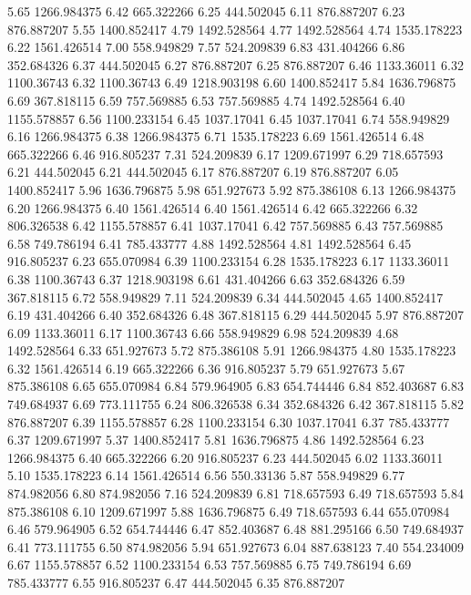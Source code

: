 5.65 	1266.984375
6.42 	665.322266
6.25 	444.502045
6.11 	876.887207
6.23 	876.887207
5.55 	1400.852417
4.79 	1492.528564
4.77 	1492.528564
4.74 	1535.178223
6.22 	1561.426514
7.00 	558.949829
7.57 	524.209839
6.83 	431.404266
6.86 	352.684326
6.37 	444.502045
6.27 	876.887207
6.25 	876.887207
6.46 	1133.36011
6.32 	1100.36743
6.32 	1100.36743
6.49 	1218.903198
6.60 	1400.852417
5.84 	1636.796875
6.69 	367.818115
6.59 	757.569885
6.53 	757.569885
4.74 	1492.528564
6.40 	1155.578857
6.56 	1100.233154
6.45 	1037.17041
6.45 	1037.17041
6.74 	558.949829
6.16 	1266.984375
6.38 	1266.984375
6.71 	1535.178223
6.69 	1561.426514
6.48 	665.322266
6.46 	916.805237
7.31 	524.209839
6.17 	1209.671997
6.29 	718.657593
6.21 	444.502045
6.21 	444.502045
6.17 	876.887207
6.19 	876.887207
6.05 	1400.852417
5.96 	1636.796875
5.98 	651.927673
5.92 	875.386108
6.13 	1266.984375
6.20 	1266.984375
6.40 	1561.426514
6.40 	1561.426514
6.42 	665.322266
6.32 	806.326538
6.42 	1155.578857
6.41 	1037.17041
6.42 	757.569885
6.43 	757.569885
6.58 	749.786194
6.41 	785.433777
4.88 	1492.528564
4.81 	1492.528564
6.45 	916.805237
6.23 	655.070984
6.39 	1100.233154
6.28 	1535.178223
6.17 	1133.36011
6.38 	1100.36743
6.37 	1218.903198
6.61 	431.404266
6.63 	352.684326
6.59 	367.818115
6.72 	558.949829
7.11 	524.209839
6.34 	444.502045
4.65 	1400.852417
6.19 	431.404266
6.40 	352.684326
6.48 	367.818115
6.29 	444.502045
5.97 	876.887207
6.09 	1133.36011
6.17 	1100.36743
6.66 	558.949829
6.98 	524.209839
4.68 	1492.528564
6.33 	651.927673
5.72 	875.386108
5.91 	1266.984375
4.80 	1535.178223
6.32 	1561.426514
6.19 	665.322266
6.36 	916.805237
5.79 	651.927673
5.67 	875.386108
6.65 	655.070984
6.84 	579.964905
6.83 	654.744446
6.84 	852.403687
6.83 	749.684937
6.69 	773.111755
6.24 	806.326538
6.34 	352.684326
6.42 	367.818115
5.82 	876.887207
6.39 	1155.578857
6.28 	1100.233154
6.30 	1037.17041
6.37 	785.433777
6.37 	1209.671997
5.37 	1400.852417
5.81 	1636.796875
4.86 	1492.528564
6.23 	1266.984375
6.40 	665.322266
6.20 	916.805237
6.23 	444.502045
6.02 	1133.36011
5.10 	1535.178223
6.14 	1561.426514
6.56 	550.33136
5.87 	558.949829
6.77 	874.982056
6.80 	874.982056
7.16 	524.209839
6.81 	718.657593
6.49 	718.657593
5.84 	875.386108
6.10 	1209.671997
5.88 	1636.796875
6.49 	718.657593
6.44 	655.070984
6.46 	579.964905
6.52 	654.744446
6.47 	852.403687
6.48 	881.295166
6.50 	749.684937
6.41 	773.111755
6.50 	874.982056
5.94 	651.927673
6.04 	887.638123
7.40 	554.234009
6.67 	1155.578857
6.52 	1100.233154
6.53 	757.569885
6.75 	749.786194
6.69 	785.433777
6.55 	916.805237
6.47 	444.502045
6.35 	876.887207
